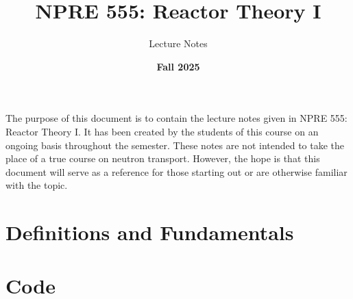 \documentclass{lecture_notes}
\title{NPRE 555: Reactor Theory I}
\subtitle{Lecture Notes}
\date{\textbf{Fall 2025}}
\theoremstyle{definition}
\begin{document}
\frontmatter

\begin{foreword}
  The purpose of this document is to contain the lecture notes given in NPRE 555: Reactor Theory I.
  It has been created by the students of this course on an ongoing basis throughout the semester.
  These notes are not intended to take the place of a true course on neutron transport.
  However, the hope is that this document will serve as a reference for those starting out or are otherwise familiar with the topic.
\end{foreword}

\tableofcontents
\clearpage

\setcounter{page}{1}

\section{Definitions and Fundamentals}

\appendix
\section{Code}



\end{document}
